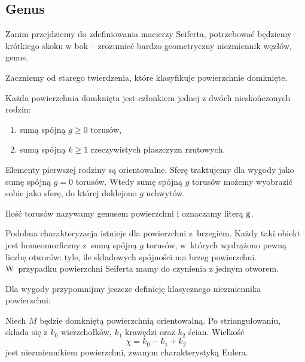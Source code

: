 \subsection{Genus}
%
Zanim przejdziemy do zdefiniowania macierzy Seiferta, potrzebować będziemy krótkiego skoku w bok -- zrozumieć bardzo geometryczny niezmiennik węzłów, genus.

Zaczniemy od starego twierdzenia, które klasyfikuje powierzchnie domknięte.

\begin{proposition}
    Każda powierzchnia domknięta jest członkiem jednej z dwóch nieskończonych rodzin:
    \begin{enumerate}[leftmargin=*]
        \itemsep0em
        \item sumą spójną $g \ge 0$ torusów,
        \item sumą spójną $k \ge 1$ rzeczywistych płaszczyzn rzutowych.
    \end{enumerate}
\end{proposition}

Elementy pierwszej rodziny są orientowalne.
Sferę traktujemy dla wygody jako sumę spójną $g = 0$ torusów.
Wtedy sumę spójną $g$ torusów możemy wyobrazić sobie jako sferę, do której doklejono $g$ uchwytów.

\begin{definition}
    Ilość torusów nazywamy genusem powierzchni i oznaczamy literą $\operatorname{g}$.
\end{definition}

Podobna charakteryzacja istnieje dla powierzchni z~brzegiem.
Każdy taki obiekt jest homeomorficzny z~sumą spójną $g$ torusów, w~których wydrążono pewną liczbę otworów: tyle, ile składowych spójności ma brzeg powierzchni.
W~przypadku powierzchni Seiferta mamy do czynienia z jednym otworem.

Dla wygody przypomnijmy jeszcze definicję klasycznego niezmiennika powierzchni:

\begin{definition}
%
    Niech $M$ będzie domkniętą powierzchnią orientowalną.
    Po striangulowaniu, składa się z $k_0$ wierzchołków, $k_1$ krawędzi oraz $k_2$ ścian.
    Wielkość
    \begin{equation}
        \chi = k_0 - k_1 + k_2
    \end{equation}
    jest niezmiennikiem powierzchni, zwanym charakterystyką Eulera.
\end{definition}

